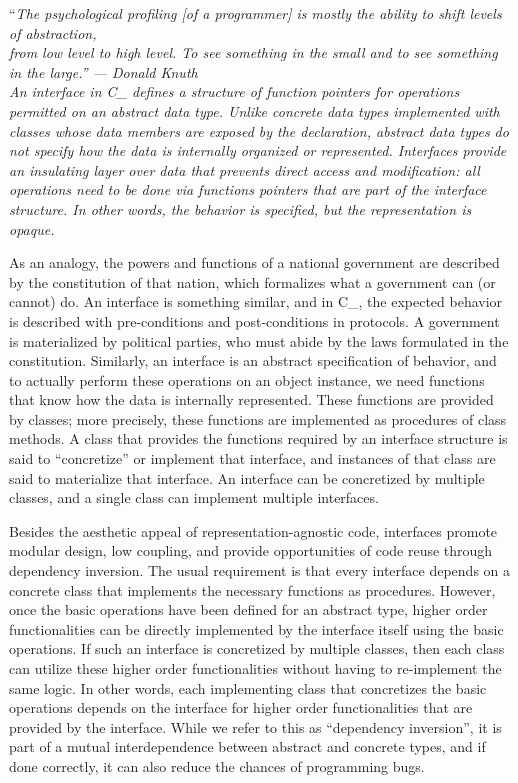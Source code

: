 \def\Section#1{\section{#1}}

``\it{The psychological profiling [of a programmer] is mostly the
ability to shift levels of abstraction,\\from low level to high level.
To see something in the small and to see something in the large.}''
— Donald Knuth\\

An interface in C\_ defines a structure of function pointers
for operations permitted on an abstract data type.
Unlike concrete data types implemented with classes whose data members
are exposed by the declaration, abstract data types do not specify
how the data is internally organized or represented.
Interfaces provide an insulating layer over data that prevents direct
access and modification: all operations need to be done via functions
pointers that are part of the interface structure.
In other words, the behavior is specified, but the representation is opaque.

As an analogy, the powers and functions of a national government
are described by the constitution of that nation, which
formalizes what a government can (or cannot) do.
An interface is something similar, and in C\_, the expected behavior
is described with pre-conditions and post-conditions in protocols.
A government is materialized by political parties, who must abide by the
laws formulated in the constitution.
Similarly, an interface is an abstract specification of behavior,
and to actually perform these operations on an object instance,
we need functions that know how the data is internally represented.
These functions are provided by classes; more precisely,
these functions are implemented as procedures of class methods.
A class that provides the functions required by an interface structure
is said to ``concretize'' or implement that interface, and instances of that
class are said to materialize that interface.
An interface can be concretized by multiple classes, and a single class
can implement multiple interfaces.

Besides the aesthetic appeal of representation-agnostic code,
interfaces promote modular design, low coupling, and provide
opportunities of code reuse through dependency inversion.
The usual requirement is that every interface depends on a concrete class
that implements the necessary functions as procedures.
However, once the basic operations have been defined for an abstract type,
higher order functionalities can be directly implemented by the interface itself
using the basic operations.
If such an interface is concretized by multiple classes, then each
class can utilize these higher order functionalities without
having to re-implement the same logic.
In other words, each implementing class that concretizes the basic operations
depends on the interface for higher order functionalities that are provided
by the interface.
While we refer to this as ``dependency inversion'', it is part of a
mutual interdependence between abstract and concrete types, and if done correctly,
it can also reduce the chances of programming bugs.

